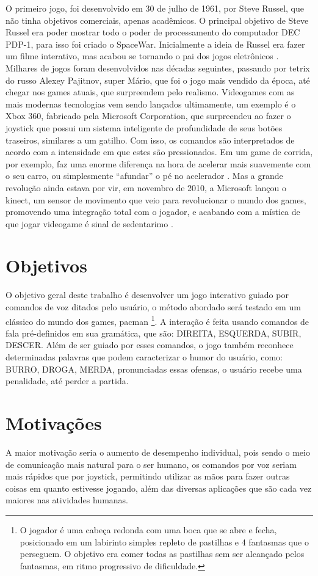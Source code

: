     O primeiro jogo, foi desenvolvido em 30 de julho de 1961, por Steve Russel, que não tinha objetivos comerciais, apenas acadêmicos. O principal objetivo de Steve Russel era poder mostrar todo o poder de processamento do computador DEC PDP-1, para isso foi criado o SpaceWar. Inicialmente a ideia de Russel era fazer um filme interativo, mas acabou se tornando o pai dos jogos eletrônicos \cite{HistJogosHenrique}. Milhares de jogos foram desenvolvidos nas décadas seguintes, passando por tetrix do russo Alexey Pajitnov, super Mário, que foi o jogo mais vendido da época, até chegar nos games atuais, que surpreendem pelo realismo. Videogames com as mais modernas tecnologias vem sendo lançados ultimamente, um exemplo é o Xbox 360, fabricado pela Microsoft Corporation, que surpreendeu ao fazer o joystick que possui um sistema inteligente de profundidade de seus botões traseiros, similares a um gatilho. Com isso, os comandos são interpretados de acordo com a intensidade em que estes são pressionados. Em um game de corrida, por exemplo, faz uma enorme diferença na hora de acelerar mais suavemente com o seu carro, ou simplesmente “afundar” o pé no acelerador \cite{XBoxTechT}. Mas a grande revolução ainda estava por vir, em novembro de 2010, a Microsoft lançou o kinect, um sensor de movimento que veio para revolucionar o mundo dos games, promovendo uma integração total com o jogador, e acabando com a mística de que jogar videogame é sinal de sedentarimo \cite{KinectTechT}.

\section{Objetivos}
O objetivo geral deste trabalho é desenvolver um jogo interativo guiado por comandos de voz ditados pelo usuário, o método abordado será testado em um clássico do mundo dos games, pacman \footnote{ O jogador é uma cabeça redonda com uma boca que se abre e fecha, posicionado em um labirinto simples repleto de pastilhas e 4 fantasmas que o perseguem. O objetivo era comer todas as pastilhas sem ser alcançado pelos fantasmas, em ritmo progressivo de dificuldade.}. A interação é feita usando comandos de fala pré-definidos em sua gramática, que são: DIREITA, ESQUERDA, SUBIR, DESCER. Além de ser guiado por esses comandos, o jogo também reconhece determinadas palavras que podem caracterizar o humor do usuário, como: BURRO, DROGA, MERDA, pronunciadas essas ofensas, o usuário recebe uma penalidade, até perder a partida. 

\section{Motivações}
A maior motivação seria o aumento de desempenho individual, pois sendo o meio de comunicação mais natural para o ser humano, os comandos por voz seriam mais rápidos que por joystick, permitindo utilizar as mãos para fazer outras coisas em quanto estivesse jogando, além das diversas aplicações que são cada vez maiores nas atividades humanas.

